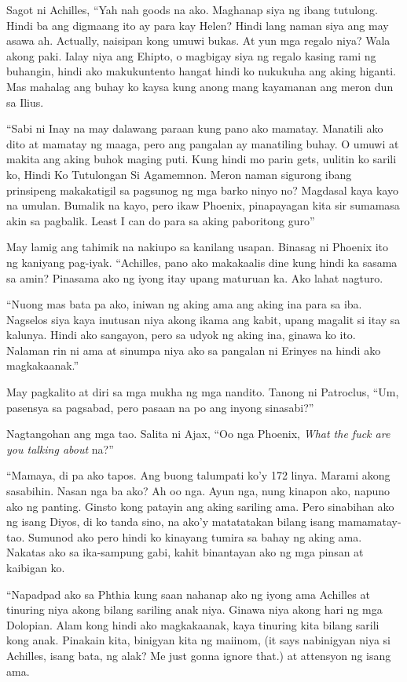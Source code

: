 \documentclass[12pt,letterpaper]{report}
\begin{document}
Sagot ni Achilles, ``Yah nah goods na ako. Maghanap siya ng ibang tutulong. Hindi ba ang digmaang ito ay para kay Helen? Hindi lang naman siya ang may asawa ah. Actually, naisipan kong umuwi bukas. At yun mga regalo niya? Wala akong paki. Ialay niya ang Ehipto, o magbigay siya ng regalo kasing rami ng buhangin, hindi ako makukuntento hangat hindi ko nukukuha ang aking higanti. Mas mahalag ang buhay ko kaysa kung anong mang kayamanan ang meron dun sa Ilius.

``Sabi ni Inay na may dalawang paraan kung pano ako mamatay. Manatili ako dito at mamatay ng maaga, pero ang pangalan ay manatiling buhay. O umuwi at makita ang aking buhok maging puti. Kung hindi mo parin gets, uulitin ko sarili ko, Hindi Ko Tutulongan Si Agamemnon. Meron naman sigurong ibang prinsipeng makakatigil sa pagsunog ng mga barko ninyo no? Magdasal kaya kayo na umulan. Bumalik na kayo, pero ikaw Phoenix, pinapayagan kita sir sumamasa akin sa pagbalik. Least I can do para sa aking paboritong guro''

May lamig ang tahimik na nakiupo sa kanilang usapan. Binasag ni Phoenix ito ng kaniyang pag-iyak. ``Achilles, pano ako makakaalis dine kung hindi ka sasama sa amin? Pinasama ako ng iyong itay upang maturuan ka. Ako lahat nagturo.

``Nuong mas bata pa ako, iniwan ng aking ama ang aking ina para sa iba. Nagselos siya kaya inutusan niya akong ikama ang kabit, upang magalit si itay sa kalunya. Hindi ako sangayon, pero sa udyok ng aking ina, ginawa ko ito. Nalaman rin ni ama at sinumpa niya ako sa pangalan ni Erinyes na hindi ako magkakaanak.''

May pagkalito at diri sa mga mukha ng mga nandito. Tanong ni Patroclus, ``Um, pasensya sa pagsabad, pero pasaan na po ang inyong sinasabi?''

Nagtangohan ang mga tao. Salita ni Ajax, ``Oo nga Phoenix, \textit{What the fuck are you talking about} na?''

``Mamaya, di pa ako tapos. Ang buong talumpati ko'y 172 linya. Marami akong sasabihin. Nasan nga ba ako? Ah oo nga. Ayun nga, nung kinapon ako, napuno ako ng panting. Ginsto kong patayin ang aking sariling ama. Pero sinabihan ako ng isang Diyos, di ko tanda sino, na ako'y matatatakan bilang isang mamamatay-tao. Sumunod ako pero hindi ko kinayang tumira sa bahay ng aking ama. Nakatas ako sa ika-sampung gabi, kahit binantayan ako ng mga pinsan at kaibigan ko.

``Napadpad ako sa Phthia kung saan nahanap ako ng iyong ama Achilles at tinuring niya akong bilang sariling anak niya. Ginawa niya akong hari ng mga Dolopian. Alam kong hindi ako magkakaanak, kaya tinuring kita bilang sarili kong anak. Pinakain kita, binigyan kita ng maiinom, (it says nabinigyan niya si Achilles, isang bata, ng alak? Me just gonna ignore that.) at attensyon ng isang ama.
\end{document}
